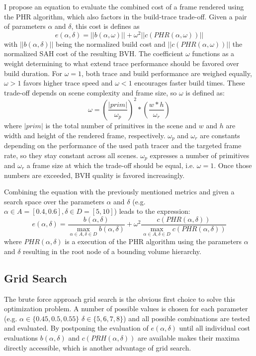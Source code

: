 I propose an equation to evaluate the combined cost of a frame rendered using the PHR algorithm, which also factors in the build-trace trade-off. Given a pair of parameters $\alpha$ and $\delta$, this cost is defines as
\[
    e(\alpha,\delta) = ||b(\alpha,\omega)|| + \omega^2 ||c(PHR(\alpha,\omega))||
\]
with $||b(\alpha,\delta)||$ being the normalized build cost and $||c(PHR(\alpha,\omega))||$ the normalized SAH cost of the resulting BVH. The coefficient $\omega$ functions as a weight determining to what extend trace performance should be favored over build duration. For $\omega=1$, both trace and build performance are weighed equally, $\omega>1$ favors higher trace speed and $\omega<1$ encourages faster build times. These trade-off depends on scene complexity and frame size, so $\omega$ is defined as:
\[
    \omega = (\frac{|prim|}{\omega_p})^2 * (\frac{w*h}{\omega_r})
\]
where $|prim|$ is the total number of primitives in the scene and $w$ and $h$ are width and height of the rendered frame, respectively. $\omega_p$ and $\omega_r$ are constants depending on the performance of the used path tracer and the targeted frame rate, so they stay constant across all scenes. $\omega_p$ expresses a number of primitives and $\omega_r$ a frame size at which the trade-off should be equal, i.e. $\omega=1$. Once those numbers are exceeded, BVH quality is favored increasingly. 

Combining the equation with the previously mentioned metrics and given a search space over the parameters $\alpha$ and $\delta$ (e.g. $\alpha\in A=[0.4,0.6], \delta\in D=[5,10]$) leads to the expression:
\[
    e(\alpha,\delta) =
        \frac{b(\alpha, \delta)}
        {\max_{\alpha\in A,\delta\in D}b(\alpha, \delta)}
        + \omega^2
        \frac{c(PHR(\alpha, \delta))}
        {\max_{\alpha\in A,\delta\in D}c(PHR(\alpha, \delta))}
\]
where $PHR(\alpha,\delta)$ is a execution of the PHR algorithm using the parameters $\alpha$ and $\delta$ resulting in the root node of a bounding volume hierarchy.
\clearpage
\subsection{Grid Search}
The brute force approach grid search is the obvious first choice to solve this optimization problem. A number of possible values is chosen for each parameter (e.g. $\alpha\in\{0.45,0.5,0.55\}$ $\delta\in\{5,6,7,8\}$) and all possible combinations are tested and evaluated. By postponing the evaluation of $e(\alpha,\delta)$ until all individual cost evaluations $b(\alpha, \delta)$ and $c(PRH(\alpha,\delta))$ are available makes their maxima directly accessible, which is another advantage of grid search. 

